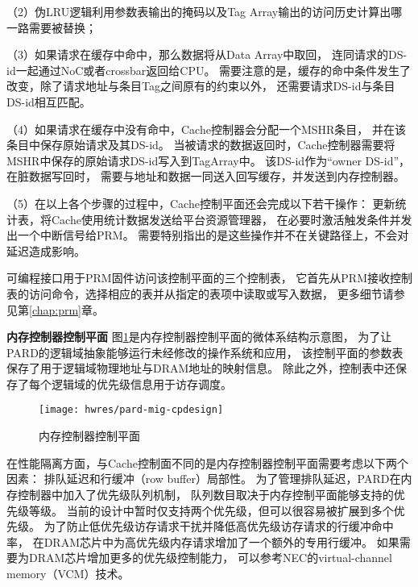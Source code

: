 （2）伪LRU逻辑利用参数表输出的掩码以及Tag Array输出的访问历史计算出哪一路需要被替换；

（3）如果请求在缓存中命中，那么数据将从Data Array中取回，
连同请求的DS-id一起通过NoC或者crossbar返回给CPU。
需要注意的是，缓存的命中条件发生了改变，除了请求地址与条目Tag之间原有的约束以外，
还需要请求DS-id与条目DS-id相互匹配。

（4）如果请求在缓存中没有命中，Cache控制器会分配一个MSHR条目，
并在该条目中保存原始请求及其DS-id。
当被请求的数据返回时，Cache控制器需要将MSHR中保存的原始请求DS-id写入到TagArray中。
该DS-id作为``owner DS-id''，在脏数据写回时，
需要与地址和数据一同送入回写缓存，并发送到内存控制器。

（5）在以上各个步骤的过程中，Cache控制平面还会完成以下若干操作：
更新统计表，将Cache使用统计数据发送给平台资源管理器，
在必要时激活触发条件并发出一个中断信号给PRM。
需要特别指出的是这些操作并不在关键路径上，不会对延迟造成影响。

可编程接口用于PRM固件访问该控制平面的三个控制表，
它首先从PRM接收控制表的访问命令，选择相应的表并从指定的表项中读取或写入数据，
更多细节请参见第\ref{chap:prm}章。


\textbf{内存控制器控制平面}\quad
图\ref{fig:pard-mig-cpdesign}是内存控制器控制平面的微体系结构示意图，
为了让PARD的逻辑域抽象能够运行未经修改的操作系统和应用，
该控制平面的参数表保存了用于逻辑域物理地址与DRAM地址的映射信息。
除此之外，控制表中还保存了每个逻辑域的优先级信息用于访存调度。

\begin{figure}[tb]
  \centering
  \texttt{[image: hwres/pard-mig-cpdesign]}
  \caption{内存控制器控制平面}
  \label{fig:pard-mig-cpdesign}
\end{figure}


在性能隔离方面，与Cache控制面不同的是内存控制器控制平面需要考虑以下两个因素：
排队延迟和行缓冲（row buffer）局部性。
为了管理排队延迟，PARD在内存控制器中加入了优先级队列机制，
队列数目取决于内存控制平面能够支持的优先级等级。
当前的设计中暂时仅支持两个优先级，但可以很容易被扩展到多个优先级。
为了防止低优先级访存请求干扰并降低高优先级访存请求的行缓冲命中率，
在DRAM芯片中为高优先级内存请求增加了一个额外的专用行缓冲。
如果需要为DRAM芯片增加更多的优先级控制能力，
可以参考NEC的virtual-channel memory（VCM）\cite{nec-vcm}技术。

